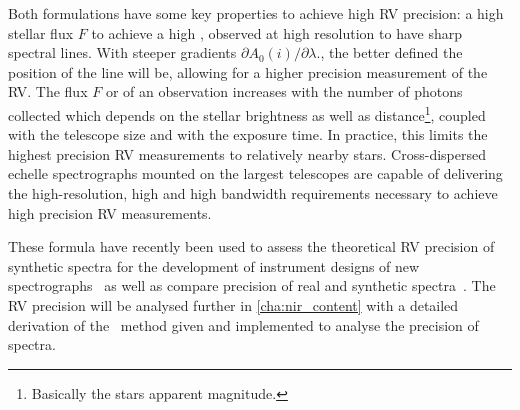 Both formulations have some key properties to achieve high {RV} precision: a high stellar flux $F$ to achieve a high \snr{}, observed at high resolution to have sharp spectral lines.
With steeper gradients $\partial A_0(i)/\partial\lambda$., the better defined the position of the line will be, allowing for a higher precision measurement of the {RV}.
The flux $F$ or \snr{} of an observation increases with the number of photons collected which depends on the stellar brightness as well as distance\footnote{Basically the stars apparent magnitude.}, coupled with the telescope size and with the exposure time.
In practice, this limits the highest precision {RV} measurements to relatively nearby stars.
Cross-dispersed echelle spectrographs mounted on the largest telescopes are capable of delivering the high-resolution, high \snr{} and high bandwidth requirements necessary to achieve high precision {RV} measurements.

These formula have recently been used to assess the theoretical {RV} precision of synthetic spectra for the development of instrument designs of new \nir{} spectrographs~\citep[e.g.][]{figueira_radial_2016} as well as compare precision of real and synthetic spectra~\citep[e.g.][]{artigau_optical_2018}.
The {RV} precision will be analysed further in \cref{cha:nir_content} with a detailed derivation of the~\citet{bouchy_fundamental_2001} method given and implemented to analyse the precision of \nir{} spectra.
